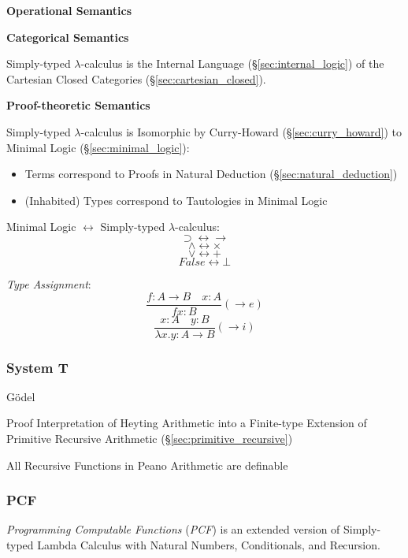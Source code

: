 \textbf{Operational Semantics}

\textbf{Categorical Semantics}

Simply-typed $\lambda$-calculus is the Internal Language
(\S\ref{sec:internal_logic}) of the Cartesian Closed Categories
(\S\ref{sec:cartesian_closed}).



\textbf{Proof-theoretic Semantics}

Simply-typed $\lambda$-calculus is Isomorphic by Curry-Howard
(\S\ref{sec:curry_howard}) to Minimal Logic
(\S\ref{sec:minimal_logic}):
\begin{itemize}
  \item Terms correspond to Proofs in Natural Deduction
    (\S\ref{sec:natural_deduction})
  \item (Inhabited) Types correspond to Tautologies in Minimal Logic
\end{itemize}



Minimal Logic $\leftrightarrow$ Simply-typed $\lambda$-calculus:
\[
  \supset \leftrightarrow \rightarrow
\] \[
  \wedge \leftrightarrow \times
\] \[
  \vee \leftrightarrow +
\] \[
  False \leftrightarrow \bot
\]



\emph{Type Assignment}:
\[
  \frac{
    f:A \rightarrow B \quad x:A
  }{
    f x : B
  }(\rightarrow e)
\]\[
  \frac{
    x:A \quad y:B
  }{
    \lambda x.y : A \rightarrow B
  }(\rightarrow i)
\]



\subsubsection{System T}\label{sec:system_t}

G\"odel

Proof Interpretation of Heyting Arithmetic into a Finite-type
Extension of Primitive Recursive Arithmetic
(\S\ref{sec:primitive_recursive})

All Recursive Functions in Peano Arithmetic are definable



\subsubsection{PCF}\label{sec:pcf}

\emph{Programming Computable Functions} (\emph{PCF}) is an extended
version of Simply-typed Lambda Calculus with Natural Numbers,
Conditionals, and Recursion.

